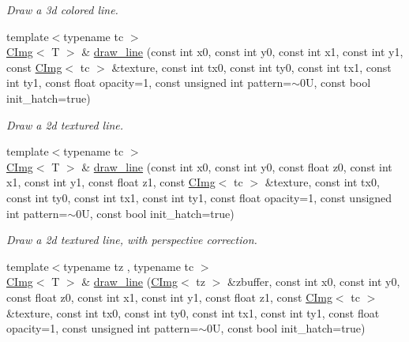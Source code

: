 \begin{DoxyCompactItemize}
\begin{DoxyCompactList}\small\item\em Draw a 3d colored line. \item\end{DoxyCompactList}\item 
{\footnotesize template$<$typename tc $>$ }\\\hyperlink{structcimg__library_1_1CImg}{CImg}$<$ T $>$ \& \hyperlink{structcimg__library_1_1CImg_ab98fc42096d2a5a075be384b1f37094c}{draw\_\-line} (const int x0, const int y0, const int x1, const int y1, const \hyperlink{structcimg__library_1_1CImg}{CImg}$<$ tc $>$ \&texture, const int tx0, const int ty0, const int tx1, const int ty1, const float opacity=1, const unsigned int pattern=$\sim$0U, const bool init\_\-hatch=true)
\begin{DoxyCompactList}\small\item\em Draw a 2d textured line. \item\end{DoxyCompactList}\item 
\hypertarget{structcimg__library_1_1CImg_a5d92088c6338270d5c9e4aadf02c0228}{
{\footnotesize template$<$typename tc $>$ }\\\hyperlink{structcimg__library_1_1CImg}{CImg}$<$ T $>$ \& \hyperlink{structcimg__library_1_1CImg_a5d92088c6338270d5c9e4aadf02c0228}{draw\_\-line} (const int x0, const int y0, const float z0, const int x1, const int y1, const float z1, const \hyperlink{structcimg__library_1_1CImg}{CImg}$<$ tc $>$ \&texture, const int tx0, const int ty0, const int tx1, const int ty1, const float opacity=1, const unsigned int pattern=$\sim$0U, const bool init\_\-hatch=true)}
\label{structcimg__library_1_1CImg_a5d92088c6338270d5c9e4aadf02c0228}

\begin{DoxyCompactList}\small\item\em Draw a 2d textured line, with perspective correction. \item\end{DoxyCompactList}\item 
\hypertarget{structcimg__library_1_1CImg_a396c0a6ac7b86969623ec22ca998d31c}{
{\footnotesize template$<$typename tz , typename tc $>$ }\\\hyperlink{structcimg__library_1_1CImg}{CImg}$<$ T $>$ \& \hyperlink{structcimg__library_1_1CImg_a396c0a6ac7b86969623ec22ca998d31c}{draw\_\-line} (\hyperlink{structcimg__library_1_1CImg}{CImg}$<$ tz $>$ \&zbuffer, const int x0, const int y0, const float z0, const int x1, const int y1, const float z1, const \hyperlink{structcimg__library_1_1CImg}{CImg}$<$ tc $>$ \&texture, const int tx0, const int ty0, const int tx1, const int ty1, const float opacity=1, const unsigned int pattern=$\sim$0U, const bool init\_\-hatch=true)}
\label{structcimg__library_1_1CImg_a396c0a6ac7b86969623ec22ca998d31c}


\end{DoxyCompactItemize}
